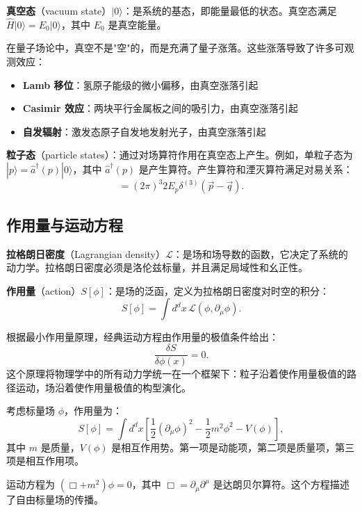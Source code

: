 \textbf{真空态}（vacuum state）$|0\rangle$：是系统的基态，即能量最低的状态。真空态满足 $\hat{H}|0\rangle = E_0|0\rangle$，其中 $E_0$ 是真空能量。

\begin{note}[真空不是"空"的]
在量子场论中，真空不是"空"的，而是充满了量子涨落。这些涨落导致了许多可观测效应：
\begin{itemize}
    \item \textbf{Lamb 移位}：氢原子能级的微小偏移，由真空涨落引起
    \item \textbf{Casimir 效应}：两块平行金属板之间的吸引力，由真空涨落引起
    \item \textbf{自发辐射}：激发态原子自发地发射光子，由真空涨落引起
\end{itemize}
\end{note}

\textbf{粒子态}（particle states）：通过对场算符作用在真空态上产生。例如，单粒子态为 $|p\rangle = \hat{a}^\dagger(p)|0\rangle$，其中 $\hat{a}^\dagger(p)$ 是产生算符。产生算符和湮灭算符满足对易关系：
\begin{equation}
    [\hat{a}(p), \hat{a}^\dagger(q)] = (2\pi)^3 2E_p \delta^{(3)}(\vec{p} - \vec{q}).
\end{equation}

\subsection{作用量与运动方程}

\textbf{拉格朗日密度}（Lagrangian density）$\mathcal{L}$：是场和场导数的函数，它决定了系统的动力学。拉格朗日密度必须是洛伦兹标量，并且满足局域性和幺正性。

\textbf{作用量}（action）$S[\phi]$：是场的泛函，定义为拉格朗日密度对时空的积分：
\begin{equation}
    S[\phi] = \int d^d x \, \mathcal{L}(\phi, \partial_\mu \phi).
\end{equation}

\begin{note}[最小作用量原理]
根据最小作用量原理，经典运动方程由作用量的极值条件给出：
\begin{equation}
    \frac{\delta S}{\delta \phi(x)} = 0.
\end{equation}
这个原理将物理学中的所有动力学统一在一个框架下：粒子沿着使作用量极值的路径运动，场沿着使作用量极值的构型演化。
\end{note}

\begin{example}
考虑标量场 $\phi$，作用量为：
\begin{equation}
    S[\phi] = \int d^d x \left[ \frac{1}{2}(\partial_\mu \phi)^2 - \frac{1}{2}m^2 \phi^2 - V(\phi) \right],
\end{equation}
其中 $m$ 是质量，$V(\phi)$ 是相互作用势。第一项是动能项，第二项是质量项，第三项是相互作用项。

运动方程为 $(\Box + m^2)\phi = 0$，其中 $\Box = \partial_\mu \partial^\mu$ 是达朗贝尔算符。这个方程描述了自由标量场的传播。
\end{example}

